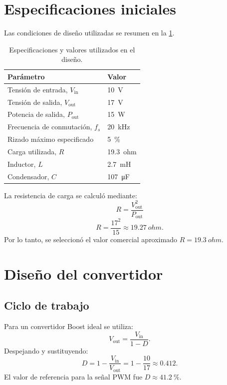 \documentclass[12pt]{article}
\begin{document}
\section{Especificaciones iniciales}
Las condiciones de diseño utilizadas se resumen en la \cref{tab:especificaciones}.
\begin{table}[H]
\centering
\caption{Especificaciones y valores utilizados en el diseño.}
\label{tab:especificaciones}
\begin{tabular}{ll}
\toprule
\textbf{Parámetro} & \textbf{Valor}\\
\midrule
Tensión de entrada, $V_{\mathrm{in}}$ & \SI{10}{V}\\
Tensión de salida, $V_{\mathrm{out}}$ & \SI{17}{V}\\
Potencia de salida, $P_{\mathrm{out}}$ & \SI{15}{W}\\
Frecuencia de conmutación, $f_s$ & \SI{20}{kHz}\\
Rizado máximo especificado & \SI{5}{\percent}\\
Carga utilizada, $R$ & \SI{19.3}{ohm}\\
Inductor, $L$ & \SI{2.7}{mH}\\
Condensador, $C$ & \SI{107}{\micro F}\\
\bottomrule
\end{tabular}
\end{table}

La resistencia de carga se calculó mediante:
\begin{equation}
R=\frac{V_{\mathrm{out}}^2}{P_{\mathrm{out}}}
\label{eq:carga}
\end{equation}
\[
R=\frac{17^2}{15}\approx\SI{19.27}{ohm}.
\]
Por lo tanto, se seleccionó el valor comercial aproximado $R=\SI{19.3}{ohm}$.

\section{Diseño del convertidor}
\subsection{Ciclo de trabajo}
Para un convertidor Boost ideal se utiliza:
\begin{equation}
V_{\mathrm{out}}=\frac{V_{\mathrm{in}}}{1-D}.
\label{eq:boost}
\end{equation}
Despejando y sustituyendo:
\begin{equation}
D=1-\frac{V_{\mathrm{in}}}{V_{\mathrm{out}}}=1-\frac{10}{17}\approx0.412.
\label{eq:duty}
\end{equation}
El valor de referencia para la señal PWM fue $D\approx\SI{41.2}{\percent}$.
\end{document}
